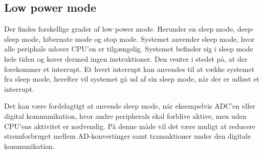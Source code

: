 \subsection{Low power mode}

Der findes forskellige grader af low power mode. Herunder en sleep mode, deep-sleep mode, hibernate mode og stop mode. Systemet anvender sleep mode, hvor alle periphals udover CPU'en er tilgængelig. Systemet befinder sig i sleep mode hele tiden og kører dermed ingen instruktioner. Den venter i stedet på, at der forekommer et interrupt. Et hvert interrupt kan anvendes til at vække systemet fra sleep mode, herefter vil systemet gå ud af sin sleep mode, når der er udløst et interrupt. 

Det kan være fordelagtigt at anvende sleep mode, når eksempelvis ADC'en eller digital kommunikation, hvor andre peripherals skal forblive aktive, men uden CPU'ens aktivitet er nødvendig. På denne måde vil det være muligt at reducere strømforbruget mellem AD-konvertinger samt transaktioner under den digitale kommunikation. 
